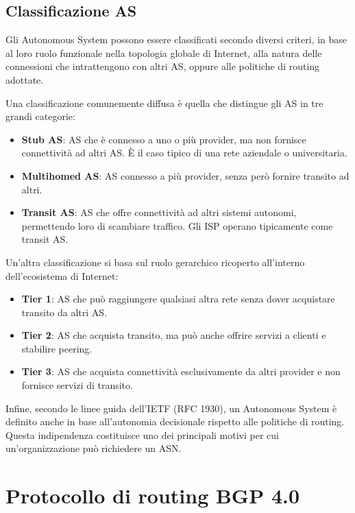 \documentclass[12pt,a4paper,twoside]{book}
\begin{document}
\section{Classificazione AS}

Gli Autonomous System possono essere classificati secondo diversi criteri, in base al loro ruolo funzionale nella topologia globale di Internet, alla natura delle connessioni che intrattengono con altri \ac{AS}, oppure alle politiche di routing adottate.

Una classificazione comunemente diffusa è quella che distingue gli \ac{AS} in tre grandi categorie:
\begin{itemize}
    \item \textbf{Stub AS}: \ac{AS} che è connesso a uno o più provider, ma non fornisce connettività ad altri \ac{AS}. È il caso tipico di una rete aziendale o universitaria.
    \item \textbf{Multihomed AS}: \ac{AS} connesso a più provider, senza però fornire transito ad altri.
    \item \textbf{Transit AS}: \ac{AS} che offre connettività ad altri sistemi autonomi, permettendo loro di scambiare traffico. Gli \ac{ISP} operano tipicamente come transit \ac{AS}.
\end{itemize}

Un'altra classificazione si basa sul ruolo gerarchico ricoperto all’interno dell’ecosistema di Internet:
\begin{itemize}
    \item \textbf{Tier 1}: \ac{AS} che può raggiungere qualsiasi altra rete senza dover acquistare transito da altri AS.
    \item \textbf{Tier 2}: \ac{AS} che acquista transito, ma può anche offrire servizi a clienti e stabilire peering.
    \item \textbf{Tier 3}: \ac{AS} che acquista connettività esclusivamente da altri provider e non fornisce servizi di transito.
\end{itemize}

Infine, secondo le linee guida dell’\ac{IETF} (RFC 1930), un Autonomous System è definito anche in base all’autonomia decisionale rispetto alle politiche di routing. Questa indipendenza costituisce uno dei principali motivi per cui un’organizzazione può richiedere un \ac{ASN}.

\chapter{Protocollo di routing BGP 4.0}
\end{document}
